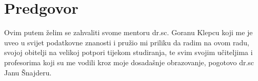 \chapter*{Predgovor}

Ovim putem želim se zahvaliti svome mentoru dr.sc. Goranu Klepcu koji me je uveo u svijet podatkovne znanosti i pružio mi priliku da radim na ovom radu, svojoj obitelji na velikoj potpori tijekom studiranja, te svim svojim učiteljima i profesorima koji su me vodili kroz moje dosadašnje obrazovanje, pogotovo dr.sc Janu Šnajderu.
